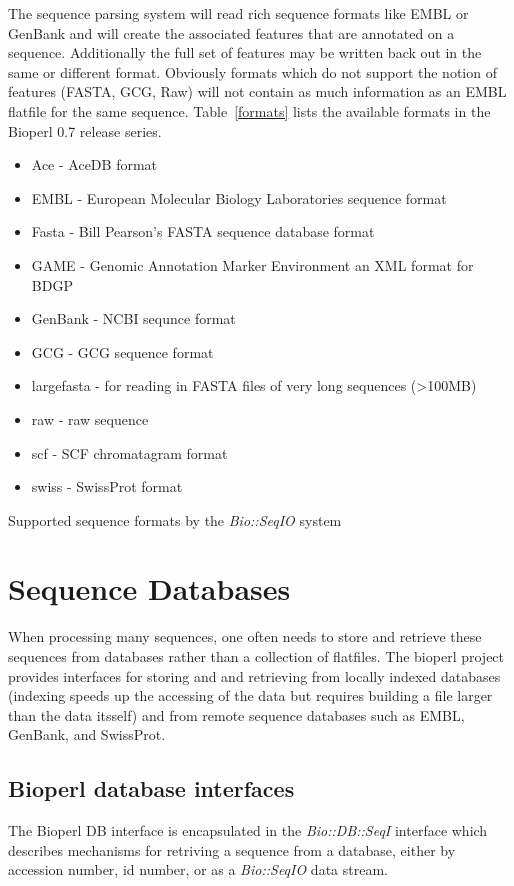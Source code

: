 \documentclass{article}
\begin{document}
\par The sequence parsing system will read rich sequence formats like
EMBL or GenBank and will create the associated features that are annotated
on a sequence.  Additionally the full set of features may be written
back out in the same or different format.  Obviously formats which do
not support the notion of features (FASTA, GCG, Raw) will not contain
as much information as an EMBL flatfile for the same sequence.
Table~\ref{formats} lists the available formats in the Bioperl 0.7
release series.
\begin{table}
\begin{itemize}
\item Ace     - AceDB format
\item EMBL    - European Molecular Biology Laboratories sequence format
\item Fasta   - Bill Pearson's FASTA sequence database format
\item GAME    - Genomic Annotation Marker Environment an XML format
for BDGP
\item GenBank - NCBI sequnce format
\item GCG     - GCG sequence format
\item largefasta - for reading in FASTA files of very long sequences
(>100MB)
\item raw     - raw sequence
\item scf     - SCF chromatagram format
\item swiss   - SwissProt format
\end{itemize}
\label{formats}
\caption{Supported sequence formats by the \emph{Bio::SeqIO} system}
\end{table}

\section{Sequence Databases}

When processing many sequences, one often needs to store and retrieve
these sequences from databases rather than a collection of flatfiles.
The bioperl project provides interfaces for storing and and retrieving
from locally indexed databases (indexing speeds up the accessing of
the data but requires building a file larger than the data itsself)
and from remote sequence databases such as EMBL, GenBank, and SwissProt.

\subsection{Bioperl database interfaces}
The Bioperl DB interface is encapsulated in the \emph{Bio::DB::SeqI}
interface which describes mechanisms for retriving a sequence from a
database, either by accession number, id number, or as a
\emph{Bio::SeqIO} data stream.
\end{document}
